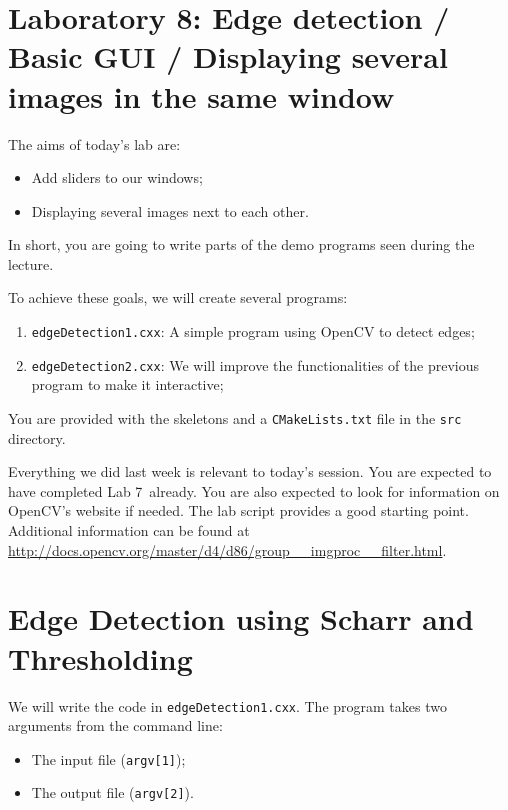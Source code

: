 \documentclass[english,a4paper,12pt,oneside]{article}
\begin{document}
\sloppy 

\section*{Laboratory 8: Edge detection / Basic GUI / Displaying several images in the same window}

\null\vfill
The aims of today's lab are:
\begin{itemize}
	\item Add sliders to our windows;
	\item Displaying several images next to each other.
\end{itemize}
In short, you are going to write parts of the demo programs seen during the lecture.

To achieve these goals, we will create several programs:
\begin{enumerate}
	\item \verb+edgeDetection1.cxx+: A simple program using OpenCV to detect edges;
	\item \verb+edgeDetection2.cxx+: We will improve the functionalities of the previous program to make it interactive;
\end{enumerate}
You are provided with the skeletons and a \verb+CMakeLists.txt+  file in the \verb+src+ directory. 

Everything we did last week is relevant to today's session. 
You are expected to have completed Lab 7~already. 
You are also expected to look for information on OpenCV's website if needed. 
The lab script provides a good starting point. 
Additional information can be found at \url{http://docs.opencv.org/master/d4/d86/group__imgproc__filter.html}.
\vfill\null

\newpage
\section{Edge Detection using Scharr and Thresholding}

We will write the code in \verb+edgeDetection1.cxx+.
The program takes two arguments from the command line:
\begin{itemize}
 \item The input file (\verb+argv[1]+); 
 \item The output file (\verb+argv[2]+).
\end{itemize}
\end{document}
